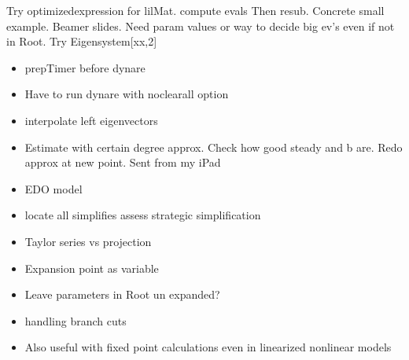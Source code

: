\documentclass[12pt]{article}
\begin{document}
Try optimizedexpression for lilMat.
compute evals Then resub.
Concrete small example.
Beamer slides.
Need param values or way to decide big ev's even if not in  Root.
Try Eigensystem[xx,2]


\begin{itemize}
\item prepTimer before dynare
\item Have to run dynare with noclearall option
\item interpolate left eigenvectors
\item 
Estimate with certain degree approx.
Check how good steady and b are. Redo approx at new point.
Sent from my iPad

\item EDO model

\item locate all simplifies assess strategic simplification
\item Taylor series vs projection
\item Expansion point as variable
\item Leave parameters in Root un expanded?
\item handling branch cuts
\item Also useful with fixed point calculations even in linearized nonlinear models


\end{itemize}
\end{document}
